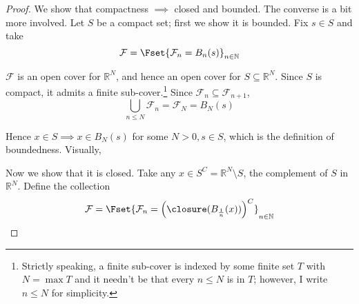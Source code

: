 \documentclass{article}
\begin{document}
\begin{proof}
  We show that compactness $\implies$ closed and bounded. The converse is a bit more involved. Let $S$ be a compact set; first we show it is bounded. Fix $s \in S$ and take
  \[
    \mathcal{F} = \Fset{\mathcal{F}_n = B_n(s)}_{n \in \mathbb{N}}
  \]

  $\mathcal{F}$ is an open cover for $\mathbb{R}^N$, and hence an open cover for $S \subseteq \mathbb{R}^N$. Since $S$ is compact, it admits a finite sub-cover.\footnote{Strictly speaking, a finite  sub-cover is indexed by some finite set $T$ with $N = \max T$ and it needn't be that every $n \le N$ is in $T$; however, I write $n \le N$ for simplicity.} Since $\mathcal{F}_n \subseteq \mathcal{F}_{n + 1}$,
  \[
    \bigcup_{n \le N} \mathcal{F}_n = \mathcal{F}_N = B_N(s)
  \]

  Hence $x \in S \implies x \in B_N(s)$ for some $N > 0, s \in S$, which is the definition of boundedness. Visually,
  \begin{figure}[H]
    \centering
  \end{figure}

  Now we show that it is closed. Take any $x \in S^C = \mathbb{R}^N \setminus S$, the complement of $S$ in $\mathbb{R}^N$. Define the collection
  \[
    \mathcal{F} = \Fset{\mathcal{F}_n = \left(\closure(B_{\frac{1}{n}}(x))\right)^C}_{n \in \mathbb{N}}
  \]


\end{proof}
\end{document}
